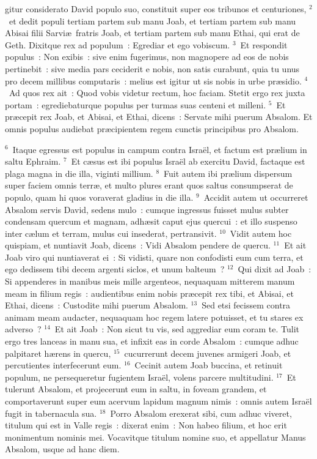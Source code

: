 \bchapter
{}gitur considerato David populo suo, constituit super eos tribunos et centuriones,
${}^{2}$~et dedit populi tertiam partem sub manu Joab, et tertiam partem sub manu Abisai filii Sarvi\ae\ fratris Joab, et tertiam partem sub manu Ethai, qui erat de Geth. Dixitque rex ad populum~: Egrediar et ego vobiscum.
${}^{3}$~Et respondit populus~: Non exibis~: sive enim fugerimus, non magnopere ad eos de nobis pertinebit~: sive media pars ceciderit e nobis, non satis curabunt, quia tu unus pro decem millibus computaris~: melius est igitur ut sis nobis in urbe pr\ae sidio.
${}^{4}$~Ad quos rex ait~: Quod vobis videtur rectum, hoc faciam. Stetit ergo rex juxta portam~: egrediebaturque populus per turmas suas centeni et milleni.
${}^{5}$~Et pr\ae cepit rex Joab, et Abisai, et Ethai, dicens~: Servate mihi puerum Absalom. Et omnis populus audiebat pr\ae cipientem regem cunctis principibus pro Absalom.


${}^{6}$~Itaque egressus est populus in campum contra Isra\"el, et factum est pr\ae lium in saltu Ephraim.
${}^{7}$~Et c\ae sus est ibi populus Isra\"el ab exercitu David, factaque est plaga magna in die illa, viginti millium.
${}^{8}$~Fuit autem ibi pr\ae lium dispersum super faciem omnis terr\ae , et multo plures erant quos saltus consumpserat de populo, quam hi quos voraverat gladius in die illa.
${}^{9}$~Accidit autem ut occurreret Absalom servis David, sedens mulo~: cumque ingressus fuisset mulus subter condensam quercum et magnam, adh\ae sit caput ejus quercui~: et illo suspenso inter c\ae lum et terram, mulus cui insederat, pertransivit.
${}^{10}$~Vidit autem hoc quispiam, et nuntiavit Joab, dicens~: Vidi Absalom pendere de quercu.
${}^{11}$~Et ait Joab viro qui nuntiaverat ei~: Si vidisti, quare non confodisti eum cum terra, et ego dedissem tibi decem argenti siclos, et unum balteum~?
${}^{12}$~Qui dixit ad Joab~: Si appenderes in manibus meis mille argenteos, nequaquam mitterem manum meam in filium regis~: audientibus enim nobis pr\ae cepit rex tibi, et Abisai, et Ethai, dicens~: Custodite mihi puerum Absalom.
${}^{13}$~Sed etsi fecissem contra animam meam audacter, nequaquam hoc regem latere potuisset, et tu stares ex adverso~?
${}^{14}$~Et ait Joab~: Non sicut tu vis, sed aggrediar eum coram te. Tulit ergo tres lanceas in manu sua, et infixit eas in corde Absalom~: cumque adhuc palpitaret h\ae rens in quercu,
${}^{15}$~cucurrerunt decem juvenes armigeri Joab, et percutientes interfecerunt eum.
${}^{16}$~Cecinit autem Joab buccina, et retinuit populum, ne persequeretur fugientem Isra\"el, volens parcere multitudini.
${}^{17}$~Et tulerunt Absalom, et projecerunt eum in saltu, in foveam grandem, et comportaverunt super eum acervum lapidum magnum nimis~: omnis autem Isra\"el fugit in tabernacula sua.
${}^{18}$~Porro Absalom erexerat sibi, cum adhuc viveret, titulum qui est in Valle regis~: dixerat enim~: Non habeo filium, et hoc erit monimentum nominis mei. Vocavitque titulum nomine suo, et appellatur Manus Absalom, usque ad hanc diem.


